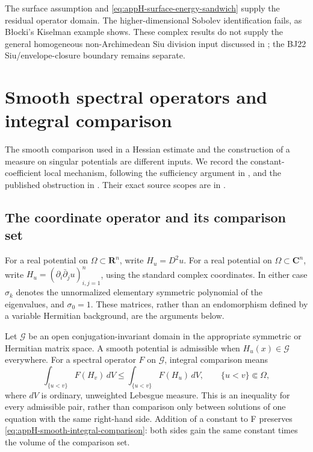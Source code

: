The surface assumption and
\eqref{eq:appH-surface-energy-sandwich} supply the residual
operator domain. The higher-dimensional Sobolev identification
fails, as Błocki's Kiselman example shows. These complex results
do not supply the general homogeneous non-Archimedean Siu
division input discussed in ; the BJ22
Siu/envelope-closure boundary remains separate.

\section{Smooth spectral operators and integral comparison}
\label{sec:appH-smooth-integral-comparison}

The smooth comparison used in a Hessian estimate and the construction
of a measure on singular potentials are different inputs. We record
the constant-coefficient local mechanism, following the sufficiency
argument in \cite[\S3]{DinewMygaSroka26IntegralV1}, and the published
obstruction in \cite[Theorem~4.1]{Dinew22SadullaevPublished}.
Their exact source scopes are in
.

\subsection{The coordinate operator and its comparison set}
\label{sec:appH-coordinate-comparison}

For a real potential on \(\Omega\subset\mathbf R^n\), write
\(H_u=D^2u\). For a real potential on
\(\Omega\subset\mathbf C^n\), write
\(H_u=(\partial_i\bar\partial_j u)_{i,j=1}^n\), using the
standard complex coordinates. In either case \(\sigma_k\) denotes
the unnormalized elementary symmetric polynomial of the eigenvalues,
and \(\sigma_0=1\). These matrices, rather than an endomorphism
defined by a variable Hermitian background, are the arguments below.

Let \(\mathcal G\) be an open conjugation-invariant domain in the
appropriate symmetric or Hermitian matrix space. A smooth potential
is admissible when \(H_u(x)\in\mathcal G\) everywhere. For a spectral
operator \(F\) on \(\mathcal G\), integral comparison means
\[
 \tag{H.8}\label{eq:appH-smooth-integral-comparison}
 \int_{\{u<v\}}F(H_v)\,dV
       \leq\int_{\{u<v\}}F(H_u)\,dV,
 \qquad \{u<v\}\Subset\Omega,
\]
where \(dV\) is ordinary, unweighted Lebesgue measure. This is an
inequality for every admissible pair, rather than comparison only
between solutions of one equation with the same right-hand side.
Addition of a constant to F preserves
\eqref{eq:appH-smooth-integral-comparison}: both sides gain the
same constant times the volume of the comparison set.

